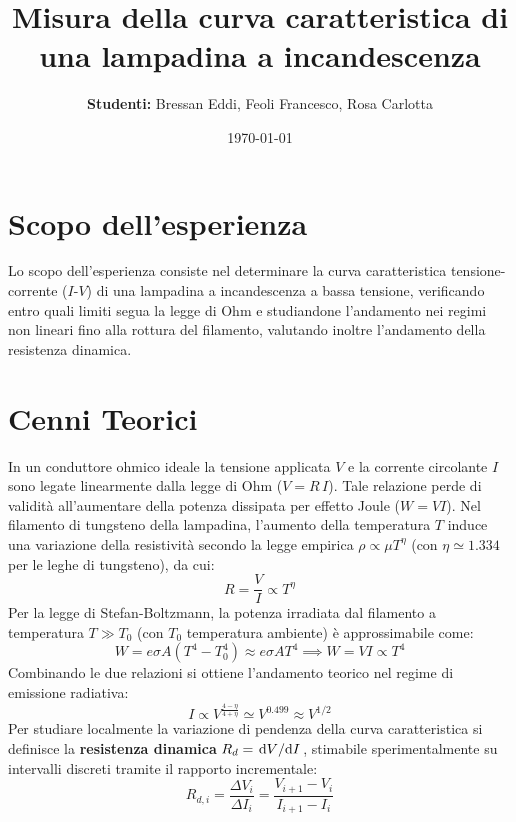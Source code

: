 \documentclass[a4paper,11pt]{article}
\title{\textbf{Misura della curva caratteristica di una lampadina a incandescenza}}
\author{\textbf{Studenti:} Bressan Eddi, Feoli Francesco, Rosa Carlotta}
\date{\today}
\begin{document}
\maketitle
\tableofcontents
\newpage

\section{Scopo dell'esperienza}
Lo scopo dell'esperienza consiste nel determinare la curva caratteristica tensione-corrente ($I$-$V$) di una lampadina a incandescenza a bassa tensione, verificando entro quali limiti segua la legge di Ohm e studiandone l'andamento nei regimi non lineari fino alla rottura del filamento, valutando inoltre l'andamento della resistenza dinamica.

\section{Cenni Teorici}
In un conduttore ohmico ideale la tensione applicata $V$ e la corrente circolante $I$ sono legate linearmente dalla legge di Ohm ($V = R \, I$). Tale relazione perde di validità all'aumentare della potenza dissipata per effetto Joule ($W = V I$). Nel filamento di tungsteno della lampadina, l'aumento della temperatura $T$ induce una variazione della resistività secondo la legge empirica $\rho \propto \mu T^\eta$ (con $\eta \simeq 1.334$ per le leghe di tungsteno), da cui:
\begin{equation*}
    R = \frac{V}{I} \propto T^\eta
\end{equation*}
Per la legge di Stefan-Boltzmann, la potenza irradiata dal filamento a temperatura $T \gg T_0$ (con $T_0$ temperatura ambiente) è approssimabile come:
\begin{equation*}
    W = e \sigma A (T^4 - T_0^4) \approx e \sigma A T^4 \implies W = V I \propto T^4
\end{equation*}
Combinando le due relazioni si ottiene l'andamento teorico nel regime di emissione radiativa:
\begin{equation*}
    I \propto V^{\frac{4-\eta}{4+\eta}} \simeq V^{0.499} \approx V^{1/2}
\end{equation*}
Per studiare localmente la variazione di pendenza della curva caratteristica si definisce la \textbf{resistenza dinamica} $R_d = \dv*{V}{I}$, stimabile sperimentalmente su intervalli discreti tramite il rapporto incrementale:
\begin{equation*}
    R_{d,i} = \frac{\Delta V_i}{\Delta I_i} = \frac{V_{i+1} - V_i}{I_{i+1} - I_i}
\end{equation*}
\end{document}
